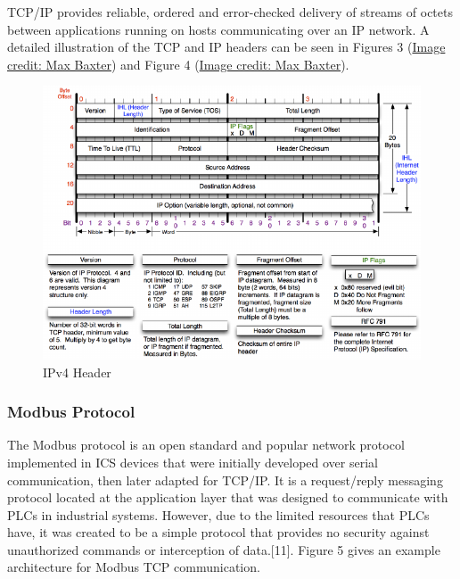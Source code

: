 \documentclass[11pt,]{article}
\begin{document}
TCP/IP provides reliable, ordered and error-checked delivery of streams
of octets between applications running on hosts communicating over an IP
network. A detailed illustration of the TCP and IP headers can be seen
in Figures 3
(\href{http://nmap.org/book/images/hdr/MJB-TCP-Header}{Image credit: Max
Baxter}) and Figure 4
(\href{http://nmap.org/book/images/hdr/MJB-IP-Header}{Image credit: Max
Baxter}).

\begin{figure}[bottom]

{\centering \includegraphics{thesis_files/figure-latex/unnamed-chunk-6-1} 

}

\caption{IPv4 Header}\label{fig:unnamed-chunk-6}
\end{figure}

\subsubsection{Modbus Protocol}\label{modbus-protocol}

The Modbus protocol is an open standard and popular network protocol
implemented in ICS devices that were initially developed over serial
communication, then later adapted for TCP/IP. It is a request/reply
messaging protocol located at the application layer that was designed to
communicate with PLCs in industrial systems. However, due to the limited
resources that PLCs have, it was created to be a simple protocol that
provides no security against unauthorized commands or interception of
data.{[}11{]}. Figure 5 gives an example architecture for Modbus TCP
communication.
\end{document}
